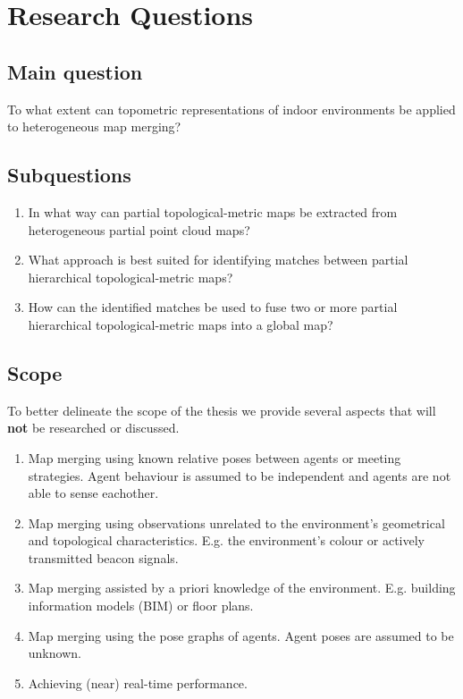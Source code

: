 \section{Research Questions}

\subsection{Main question}
To what extent can topometric representations of indoor environments be applied to heterogeneous map merging?

\subsection{Subquestions}
\begin{enumerate}
    \item In what way can partial topological-metric maps be extracted from heterogeneous partial point cloud maps?
    \item What approach is best suited for identifying matches between partial hierarchical topological-metric maps?
    \item How can the identified matches be used to fuse two or more partial hierarchical topological-metric maps into a global map?
\end{enumerate}

\subsection{Scope}
To better delineate the scope of the thesis we provide several aspects that will \textbf{not} be researched or discussed. 

\begin{enumerate}
    \item Map merging using known relative poses between agents or meeting strategies. Agent behaviour is assumed to be independent and agents are not able to sense eachother.
    \item Map merging using observations unrelated to the environment's geometrical and topological characteristics. E.g. the environment's colour or actively transmitted beacon signals.
    \item Map merging assisted by a priori knowledge of the environment. E.g. building information models (BIM) or floor plans.
    \item Map merging using the pose graphs of agents. Agent poses are assumed to be unknown.
    \item Achieving (near) real-time performance.
\end{enumerate}